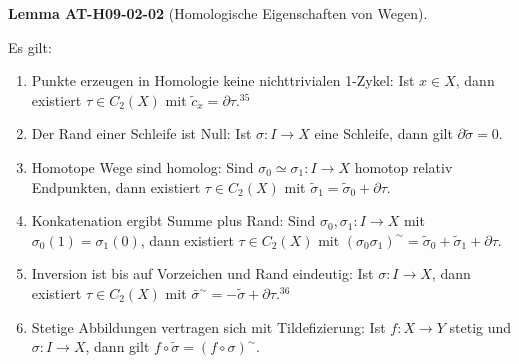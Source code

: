 \documentclass[10pt, letterpaper]{article}
\newcommand{\CustomHeading}[3]{%
  \par\medskip\noindent%
  \textbf{#1 #2} \textnormal{(#3)}.\enskip%
}
\newenvironment{LEM}[2]{\CustomHeading{Lemma}{#1}{#2}}{}
\begin{document}
\begin{LEM}{AT-H09-02-02}{Homologische Eigenschaften von Wegen}
Es gilt:
\begin{enumerate}[label=(\roman*)]
    \item Punkte erzeugen in Homologie keine nichttrivialen 1-Zykel: Ist $x \in X$, dann existiert $\tau \in C_2(X)$ mit $\tilde{c}_x = \partial \tau$.${}^{35}$
    
    \item Der Rand einer Schleife ist Null: Ist $\sigma: I \rightarrow X$ eine Schleife, dann gilt $\partial \tilde{\sigma} = 0$.
    
    \item Homotope Wege sind homolog: Sind $\sigma_0 \simeq \sigma_1: I \rightarrow X$ homotop relativ Endpunkten, dann existiert $\tau \in C_2(X)$ mit $\tilde{\sigma}_1 = \tilde{\sigma}_0 + \partial \tau$.
    
    \item Konkatenation ergibt Summe plus Rand: Sind $\sigma_0, \sigma_1: I \rightarrow X$ mit $\sigma_0(1) = \sigma_1(0)$, dann existiert $\tau \in C_2(X)$ mit $\left( \sigma_0 \sigma_1 \right)^{\sim} = \tilde{\sigma}_0 + \tilde{\sigma}_1 + \partial \tau$.
    
    \item Inversion ist bis auf Vorzeichen und Rand eindeutig: Ist $\sigma: I \rightarrow X$, dann existiert $\tau \in C_2(X)$ mit $\bar{\sigma}^{\sim} = -\tilde{\sigma} + \partial \tau$.${}^{36}$
    
    \item Stetige Abbildungen vertragen sich mit Tildefizierung: Ist $f: X \rightarrow Y$ stetig und $\sigma: I \rightarrow X$, dann gilt $f \circ \tilde{\sigma} = (f \circ \sigma)^{\sim}$.
\end{enumerate}
\end{LEM}
\end{document}
